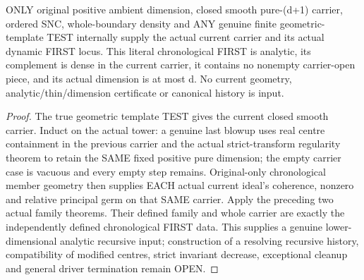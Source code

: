 \begin{theorem}
\label{hir:sharp-original-chronological-first-defect-dimension-drop}
\leanok
ONLY original positive ambient dimension, closed smooth pure-(d+1) carrier,
ordered SNC, whole-boundary density and ANY genuine finite geometric-template
TEST internally supply the actual current carrier and its actual dynamic FIRST
locus. This literal chronological FIRST is analytic, its complement is dense
in the current carrier, it contains no nonempty carrier-open piece, and its
actual dimension is at most d. No current geometry, analytic/thin/dimension
certificate or canonical history is input.
\end{theorem}
\begin{proof}
The true geometric template TEST gives the current closed smooth carrier.
Induct on the actual tower: a genuine last blowup uses real centre containment
in the previous carrier and the actual strict-transform regularity theorem
to retain the SAME fixed positive pure dimension; the empty carrier case is
vacuous and every empty step remains. Original-only chronological member
geometry then supplies EACH actual current ideal's coherence, nonzero and
relative principal germ on that SAME carrier. Apply the preceding two actual
family theorems. Their defined family and whole carrier are exactly the
independently defined chronological FIRST data. This supplies a genuine
lower-dimensional analytic recursive input; construction of a resolving
recursive history, compatibility of modified centres, strict invariant
decrease, exceptional cleanup and general driver termination remain OPEN.
\end{proof}

